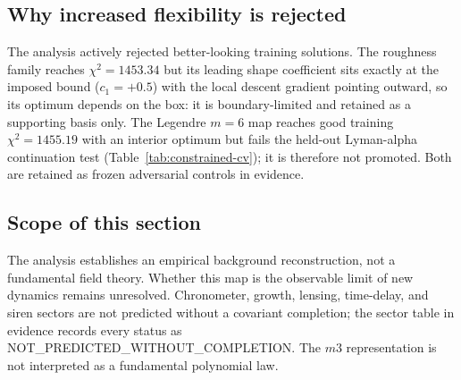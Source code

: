 \subsection{Why increased flexibility is rejected}
\label{sec:adversarial}

The analysis actively rejected better-looking training solutions. The
roughness family reaches $\chi^{2}=1453.34$ but its leading shape
coefficient sits exactly at the imposed bound ($c_{1}=+0.5$) with
the local descent gradient pointing outward, so its optimum depends
on the box: it is boundary-limited and retained as a supporting
basis only. The Legendre $m=6$ map reaches good training
$\chi^{2}=1455.19$ with an interior optimum but fails the held-out
Lyman-alpha continuation test (Table~\ref{tab:constrained-cv});
it is therefore not promoted.
Both are retained as frozen adversarial controls in
evidence.

\subsection{Scope of this section}

The analysis establishes an empirical background reconstruction,
not a fundamental field theory. Whether this map is the observable
limit of new dynamics remains unresolved. Chronometer, growth,
lensing, time-delay, and siren sectors are not predicted without a
covariant completion; the sector table in evidence records every
status as NOT\_PREDICTED\_WITHOUT\_COMPLETION. The $m3$
representation is not interpreted as a fundamental polynomial law.
